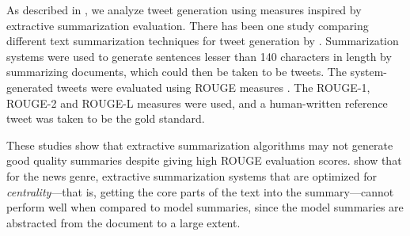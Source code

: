 As described in , we analyze tweet generation using measures inspired by extractive summarization evaluation. There has been one study comparing different text summarization techniques for tweet generation by \cite{lloret2013towards}. Summarization systems were used to generate sentences lesser than 140 characters in length by summarizing documents, which could then be taken to be tweets. The system-generated tweets were evaluated using ROUGE measures \cite{lin2004rouge}. The ROUGE-1, ROUGE-2 and ROUGE-L measures were used, and a human-written reference tweet was taken to be the gold standard. %

These studies show that extractive summarization algorithms may not generate good quality summaries despite giving high ROUGE evaluation scores. \cite{cheung2013towards} show that for the news genre, extractive summarization systems that are optimized for \textit{centrality}---that is, getting the core parts of the text into the summary---cannot perform well when compared to model summaries, since the model summaries are abstracted from the document to a large extent.
